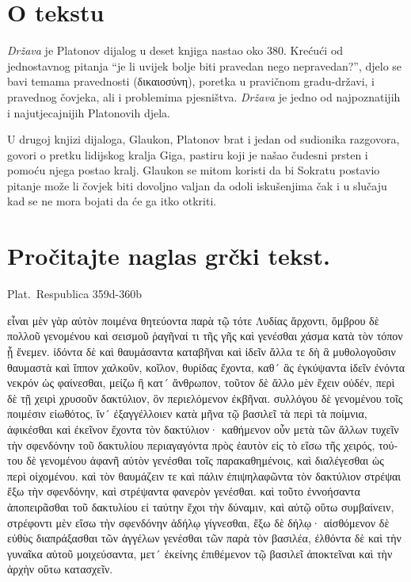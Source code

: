
\section*{O tekstu}

\textit{Država} je Platonov dijalog u deset knjiga nastao oko 380. Krećući od jednostavnog pitanja ``je li uvijek bolje biti pravedan nego nepravedan?'', djelo se bavi temama pravednosti (δικαιοσύνη), poretka u pravičnom gradu-državi, i pravednog čovjeka, ali i problemima pjesništva. \textit{Država} je jedno od najpoznatijih i najutjecajnijih Platonovih djela.

U drugoj knjizi dijaloga, Glaukon, Platonov brat i jedan od sudionika razgovora, govori o pretku lidijskog kralja Giga, pastiru koji je našao čudesni prsten i pomoću njega postao kralj. Glaukon se mitom koristi da bi Sokratu postavio pitanje može li čovjek biti dovoljno valjan da odoli iskušenjima čak i u slučaju kad se ne mora bojati da će ga itko otkriti.



\section*{Pročitajte naglas grčki tekst.}

Plat.\ Respublica 359d-360b


\medskip


{\large

\begin{greek}

  \noindent εἶναι μὲν γὰρ αὐτὸν ποιμένα θητεύοντα παρὰ τῷ τότε Λυδίας ἄρχοντι, ὄμβρου δὲ πολλοῦ γενομένου καὶ σεισμοῦ ῥαγῆναί τι τῆς γῆς καὶ γενέσθαι χάσμα κατὰ τὸν τόπον ᾗ ἔνεμεν. ἰδόντα δὲ καὶ θαυμάσαντα καταβῆναι καὶ ἰδεῖν ἄλλα τε δὴ ἃ μυθολογοῦσιν θαυμαστὰ καὶ ἵππον χαλκοῦν, κοῖλον, θυρίδας ἔχοντα, καθ´ ἃς ἐγκύψαντα ἰδεῖν ἐνόντα νεκρόν ὡς φαίνεσθαι, μείζω ἢ κατ´ ἄνθρωπον, τοῦτον δὲ ἄλλο μὲν ἔχειν οὐδέν, περὶ δὲ τῇ χειρὶ χρυσοῦν δακτύλιον, ὃν περιελόμενον ἐκβῆναι. συλλόγου δὲ γενομένου τοῖς ποιμέσιν εἰωθότος, ἵν´ ἐξαγγέλλοιεν κατὰ μῆνα τῷ βασιλεῖ τὰ περὶ τὰ ποίμνια, ἀφικέσθαι καὶ ἐκεῖνον ἔχοντα τὸν δακτύλιον· καθήμενον οὖν μετὰ τῶν ἄλλων τυχεῖν τὴν σφενδόνην τοῦ δακτυλίου περιαγαγόντα πρὸς ἑαυτὸν εἰς τὸ εἴσω τῆς χειρός, τούτου δὲ γενομένου ἀφανῆ αὐτὸν γενέσθαι τοῖς παρακαθημένοις, καὶ διαλέγεσθαι ὡς περὶ οἰχομένου. καὶ τὸν θαυμάζειν τε καὶ πάλιν ἐπιψηλαφῶντα τὸν δακτύλιον στρέψαι ἔξω τὴν σφενδόνην, καὶ στρέψαντα φανερὸν γενέσθαι. καὶ τοῦτο ἐννοήσαντα ἀποπειρᾶσθαι τοῦ δακτυλίου εἰ ταύτην ἔχοι τὴν δύναμιν, καὶ αὐτῷ οὕτω συμβαίνειν, στρέφοντι μὲν εἴσω τὴν σφενδόνην ἀδήλῳ γίγνεσθαι, ἔξω δὲ δήλῳ· αἰσθόμενον δὲ εὐθὺς διαπράξασθαι τῶν ἀγγέλων γενέσθαι τῶν παρὰ τὸν βασιλέα, ἐλθόντα δὲ καὶ τὴν γυναῖκα αὐτοῦ μοιχεύσαντα, μετ´ ἐκείνης ἐπιθέμενον τῷ βασιλεῖ ἀποκτεῖναι καὶ τὴν ἀρχὴν οὕτω κατασχεῖν.

\end{greek}

}


